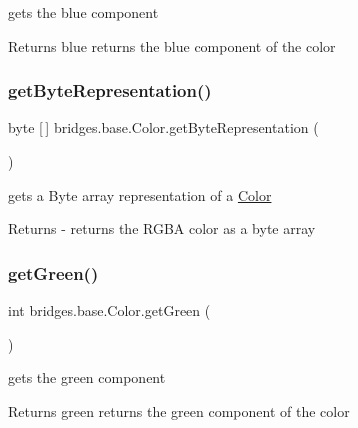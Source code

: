 gets the blue component

\begin{DoxyReturn}{Returns}
blue returns the blue component of the color 
\end{DoxyReturn}
\mbox{\label{classbridges_1_1base_1_1_color_a07215c888a6d17374a3d862ff30d5f93}} 
\subsubsection{\texorpdfstring{get\+Byte\+Representation()}{getByteRepresentation()}}
{\footnotesize\ttfamily byte \mbox{[}$\,$\mbox{]} bridges.\+base.\+Color.\+get\+Byte\+Representation (\begin{DoxyParamCaption}{ }\end{DoxyParamCaption})}

gets a Byte array representation of a \mbox{\hyperlink{classbridges_1_1base_1_1_color}{Color}}

\begin{DoxyReturn}{Returns}
-\/ returns the R\+G\+BA color as a byte array 
\end{DoxyReturn}
\mbox{\label{classbridges_1_1base_1_1_color_a8f3fdd23cf785704faa2e3701e25978f}} 
\subsubsection{\texorpdfstring{get\+Green()}{getGreen()}}
{\footnotesize\ttfamily int bridges.\+base.\+Color.\+get\+Green (\begin{DoxyParamCaption}{ }\end{DoxyParamCaption})}

gets the green component

\begin{DoxyReturn}{Returns}
green returns the green component of the color 
\end{DoxyReturn}
\mbox{\label{classbridges_1_1base_1_1_color_aced9bc89248b85686ba5385472974fe6}} 

